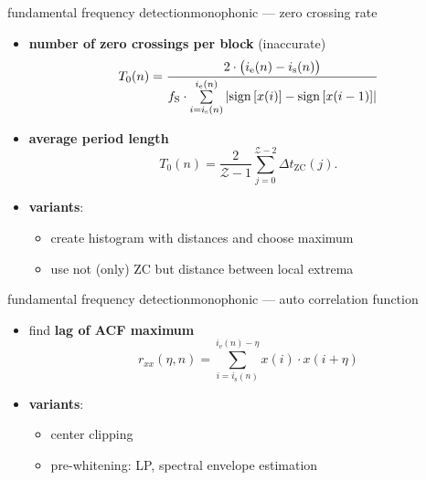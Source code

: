 	
	\begin{frame}{fundamental frequency detection}{monophonic --- zero crossing rate}
		\begin{itemize}
			\item	\textbf{number of zero crossings per block} (inaccurate)
				\begin{equation*}
					T_0(n) = \frac{2\cdot \big(i_{\mathrm{e}}(n)-i_{\mathrm{s}}(n)\big)}{f_{\mathrm{S}}\cdot\sum\limits_{i=i_{\mathrm{s}}(n)}^{i_{\mathrm{e}}(n)}{\left|\operatorname*{sign} \left[x(i)\right]-\operatorname*{sign} \left[x(i-1)\right]\right|}} 
				\end{equation*}
			\item<2->	\textbf{average period length}
				\begin{equation*}
					T_0(n) = \frac{2}{\mathcal{Z}-1}\sum\limits_{j=0}^{\mathcal{Z}-2}{\Delta t_\mathrm{ZC}(j)}.
				\end{equation*}
			\item<3->	\textbf{variants}:
				\begin{itemize}
					\item	create histogram with distances and choose maximum
					\item	use not (only) ZC but distance between local extrema
				\end{itemize}
		\end{itemize}
	\end{frame}
	
	\begin{frame}{fundamental frequency detection}{monophonic --- auto correlation function}
		\vspace{-2mm}
        \begin{itemize}
            \item find \textbf{lag of ACF maximum}
                \begin{equation*}
                    r_{xx}(\eta,n) = \sum\limits_{i=i_{\mathrm{s}}(n)}^{i_{\mathrm{e}}(n)-\eta}{x(i)\cdot x(i+\eta)}
                \end{equation*}
            \item<2->     \textbf{variants}:
                \begin{itemize}
                    \item<3->	center clipping
                            \begin{figure}
                                \centering
                                
                                \label{fig:centerclipping}
                            \end{figure}
                    \item<4->	pre-whitening: LP, spectral envelope estimation															
                \end{itemize}
        \end{itemize}
		
            
	\end{frame}
	
